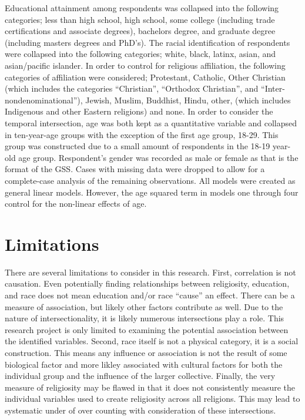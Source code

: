 \documentclass[
  12pt,
  letterpaper,
]{article}
\begin{document}
Educational attainment among respondents was collapsed into the
following categories; less than high school, high school, some college
(including trade certifications and associate degrees), bachelors
degree, and graduate degree (including masters degrees and PhD's). The
racial identification of respondents were collapsed into the following
categories; white, black, latinx, asian, and asian/pacific islander. In
order to control for religious affiliation, the following categories of
affiliation were considered; Protestant, Catholic, Other Christian
(which includes the categories ``Christian'', ``Orthodox Christian'',
and ``Inter-nondenominational''), Jewish, Muslim, Buddhist, Hindu,
other, (which includes Indigenous and other Eastern religions) and none.
In order to consider the temporal intersection, age was both kept as a
quantitative variable and collapsed in ten-year-age groups with the
exception of the first age group, 18-29. This group was constructed due
to a small amount of respondents in the 18-19 year-old age group.
Respondent's gender was recorded as male or female as that is the format
of the GSS. Cases with missing data were dropped to allow for a
complete-case analysis of the remaining observations. All models were
created as general linear models. However, the age squared term in
models one through four control for the non-linear effects of age.

\hypertarget{limitations}{%
\section{Limitations}\label{limitations}}

There are several limitations to consider in this research. First,
correlation is not causation. Even potentially finding relationships
between religiosity, education, and race does not mean education and/or
race ``cause'' an effect. There can be a measure of association, but
likely other factors contribute as well. Due to the nature of
intersectionality, it is likely numerous intersections play a role. This
research project is only limited to examining the potential association
between the identified variables. Second, race itself is not a physical
category, it is a social construction. This means any influence or
association is not the result of some biological factor and more likley
associated with cultural factors for both the individual group and the
influence of the larger collective. Finally, the very measure of
religiosity may be flawed in that it does not consistently measure the
individual variables used to create religiosity across all religions.
This may lead to systematic under of over counting with consideration of
these intersections.
\end{document}
